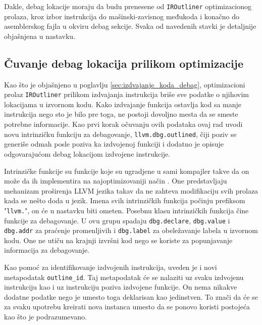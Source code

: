 \documentclass[12pt,oneside]{memoir}
\begin{document}
Dakle, debag lokacije moraju da budu prenesene od \verb|IROutliner| optimizacionog prolaza, kroz izbor instrukcija do mašinski-zavisnog međukoda i konačno do asemblerskog fajla u okviru debag sekcije.
Svaka od navedenih stavki je detaljnije objašnjena u nastavku.

\subsection{Čuvanje debag lokacija prilikom optimizacije}

Kao što je objašnjeno u poglavlju \ref{sec:izdvajanje_koda_debag},
optimizacioni prolaz \verb|IROutliner| prilikom izdvajanja instrukcija briše sve podatke o njihovim lokacijama u izvornom kodu.
Kako izdvajanje funkcija ostavlja kod sa manje instrukcija nego sto je bilo pre toga, ne postoji dovoljno mesta da se smeste potrebne informacije.
Kao prvi korak očuvanju ovih podataka ovaj rad uvodi novu intrinzičku funkciju za debagovanje, \verb|llvm.dbg.outlined|, čiji poziv se generiše odmah posle poziva ka izdvojenoj funkciji i dodatno je opisuje odgovarajućom debag lokacijom izdvojene instrukcije.

Intrinzičke funkcije su funkcije koje su ugradjene u sami kompajler takve da on može da ih implementira na najoptimizovaniji način \cite{sarda2015llvm}.
One predstavljaju mehanizam proširenja LLVM jezika takav da ne zahteva modifikaciju svih prolaza kada se nešto doda u jezik.
Imena svih intrinzičkih funkcija počinju prefiksom "\verb|llvm.|", on će u nastavku biti ometen.
Posebnu klasu intrinzičkih funkcija čine funkcije za debagovanje.
U ovu grupu spadaju \verb|dbg.declare|, \verb|dbg.value| i \verb|dbg.addr| za praćenje promenljivih i \verb|dbg.label| za obeležavanje labela u izvornom kodu.
One ne utiču na krajnji izvršni kod nego se koriste za popunjavanje informacija za debagovanje.

Kao pomoć za identifikovanje izdvojenih instrukcija, uveden je i novi metapodatak \verb|outline_id|.
Taj metapodatak će se nalaziti uz svaku izdvojenu instrukciju kao i uz instrukciju poziva izdvojene funkcije.
On nema nikakve dodatne podatke nego je umesto toga deklarisan kao jedinstven.
To znači da će se za svaku upotrebu kreirati nova instanca umesto da se ponovo koristi postojeća kao što je podrazumevano.
\end{document}
